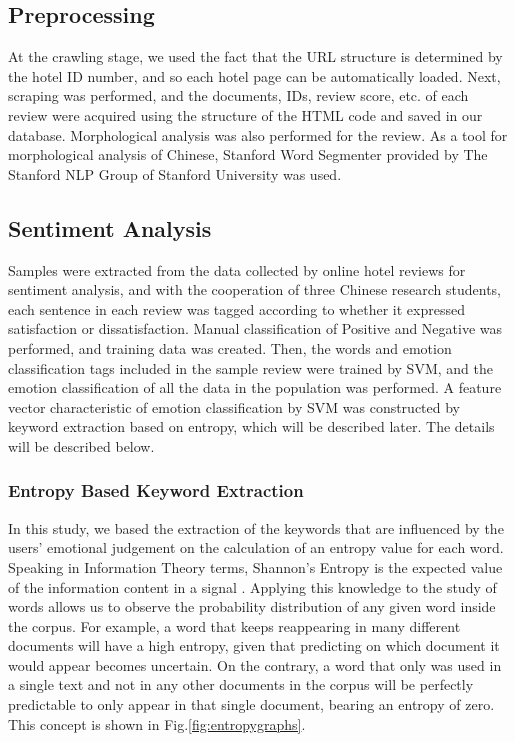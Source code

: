 \documentclass[review]{elsarticle}
\begin{document}
\subsection{Preprocessing}\label{preprocessing}

At the crawling stage, we used the fact that the URL structure is determined by the hotel ID number, and so each hotel page can be automatically loaded. Next, scraping was performed, and the documents, IDs, review score, etc. of each review were acquired using the structure of the HTML code and saved in our database. Morphological analysis was also performed for the review. As a tool for morphological analysis of Chinese, Stanford Word Segmenter \cite[][]{chang2008} provided by The Stanford NLP Group of Stanford University was used.

\subsection{Sentiment Analysis}\label{sentiment_analysis}

Samples were extracted from the data collected by online hotel reviews for sentiment analysis, and with the cooperation of three Chinese research students, each sentence in each review was tagged according to whether it expressed satisfaction or dissatisfaction. Manual classification of Positive and Negative was performed, and training data was created. Then, the words and emotion classification tags included in the sample review were trained by SVM, and the emotion classification of all the data in the population was performed. A feature vector characteristic of emotion classification by SVM was constructed by keyword extraction based on entropy, which will be described later. The details will be described below.

\subsubsection{Entropy Based Keyword Extraction}\label{entropy}

In this study, we based the extraction of the keywords that are influenced by the users’ emotional judgement on the calculation of an entropy value for each word. Speaking in Information Theory terms, Shannon’s Entropy is the expected value of the information content in a signal \cite[][]{shannon1948}. Applying this knowledge to the study of words allows us to observe the probability distribution of any given word inside the corpus. For example, a word that keeps reappearing in many different documents will have a high entropy, given that predicting on which document it would appear becomes uncertain. On the contrary, a word that only was used in a single text and not in any other documents in the corpus will be perfectly predictable to only appear in that single document, bearing an entropy of zero. This concept is shown in Fig.\ref{fig:entropygraphs}.
\end{document}
